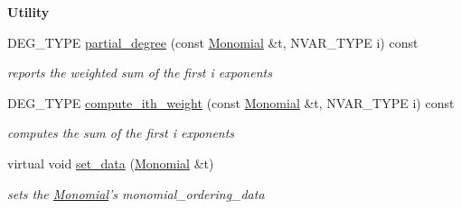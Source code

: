 \begin{Indent}\textbf{ Utility}\par
\begin{DoxyCompactItemize}
\item 
D\+E\+G\+\_\+\+T\+Y\+PE \hyperlink{class_cached_w_grevlex___ordering_af04f39af33cba2c1c4f985e57ea8d136}{partial\+\_\+degree} (const \hyperlink{class_monomial}{Monomial} \&t, N\+V\+A\+R\+\_\+\+T\+Y\+PE i) const
\begin{DoxyCompactList}\small\item\em reports the weighted sum of the first i exponents \end{DoxyCompactList}\item 
\mbox{\label{class_cached_w_grevlex___ordering_a960a5b3460c4cab0dfd89bc0663c6ee0}} 
D\+E\+G\+\_\+\+T\+Y\+PE \hyperlink{class_cached_w_grevlex___ordering_a960a5b3460c4cab0dfd89bc0663c6ee0}{compute\+\_\+ith\+\_\+weight} (const \hyperlink{class_monomial}{Monomial} \&t, N\+V\+A\+R\+\_\+\+T\+Y\+PE i) const
\begin{DoxyCompactList}\small\item\em computes the sum of the first i exponents \end{DoxyCompactList}\item 
\mbox{\label{class_cached_w_grevlex___ordering_abd2277e6f073730cdd29c5e4d4c72d2c}} 
virtual void \hyperlink{class_cached_w_grevlex___ordering_abd2277e6f073730cdd29c5e4d4c72d2c}{set\+\_\+data} (\hyperlink{class_monomial}{Monomial} \&t)
\begin{DoxyCompactList}\small\item\em sets the \hyperlink{class_monomial}{Monomial}'s {\ttfamily monomial\+\_\+ordering\+\_\+data} \end{DoxyCompactList}\end{DoxyCompactItemize}
\end{Indent}
